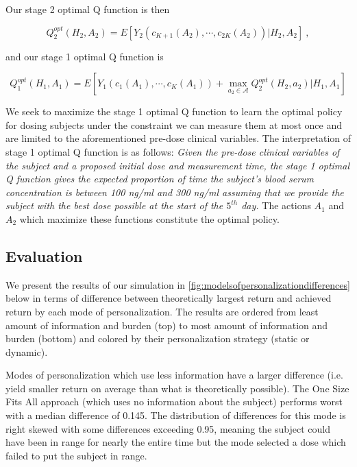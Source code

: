 Our stage 2 optimal Q function is then

\begin{equation}
Q_{2}^{o p t}\left(H_{2}, A_{2}\right)=E\left[Y_2\left(c_{K+1}(A_2), \cdots, c_{2K}(A_2)\right) \Bigg\vert H_{2}, A_{2}\right] \>,
\end{equation}

\noindent and our stage 1 optimal Q function is

\begin{equation}
Q_{1}^{o p t}\left(H_{1}, A_{1}\right)= E \left[Y_1\left(c_{1}(A_1),  \cdots, c_{K}(A_1)\right)+\max _{a_{2} \in \mathscr{A}} Q_{2}^{o p t}\left(H_{2}, a_{2}\right) \Bigg\vert H_{1}, A_{1}\right]
\end{equation}

We seek to maximize the stage 1 optimal Q function to learn the optimal policy for dosing subjects under the constraint we can measure them at most once and are limited to the aforementioned pre-dose clinical variables.  The interpretation of stage 1 optimal Q function is as follows:\textit{ Given the pre-dose clinical variables of the subject and a proposed initial dose and measurement time, the stage 1 optimal Q function gives the expected proportion of time the subject’s blood serum concentration is between 100 ng/ml and 300 ng/ml assuming that we provide the subject with the best dose possible at the start of the $ 5^{th} $ day.}  The actions $ A_1 $ and $ A_2 $ which maximize these functions constitute the optimal policy.


%


\subsection{Evaluation}

We present the results of our simulation in \cref{fig:modelsofpersonalizationdifferences} below in terms of difference between theoretically largest return and achieved return by each mode of personalization.  The results are ordered from least amount of information and burden (top) to most amount of information and burden (bottom) and colored by their personalization strategy (static or dynamic).

Modes of personalization which use less information have a larger difference (i.e. yield smaller return on average than what is theoretically possible).  The One Size Fits All approach (which uses no information about the subject) performs worst with a median difference of 0.145.  The distribution of differences for this mode is right skewed with some differences exceeding 0.95, meaning the subject could have been in range for nearly the entire time but the mode selected a dose which failed to put the subject in range. 


